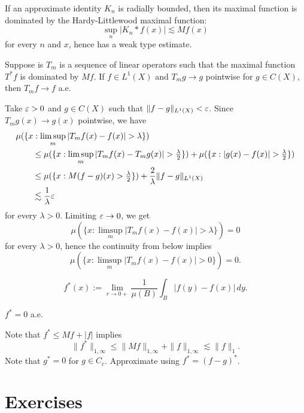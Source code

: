 \documentclass{../../large}
\begin{document}
\begin{prb}
If an approximate identity $K_n$ is radially bounded, then its maximal function is dominated by the Hardy-Littlewood maximal function:
\[\sup_n|K_n*f(x)|\lesssim Mf(x)\]
for every $n$ and $x$, hence has a weak type estimate.
\end{prb}


\begin{prb}
Suppose is $T_m$ is a sequence of linear operators such that the maximal function $T^*f$ is dominated by $Mf$.
If $f\in L^1(X)$ and $T_mg\to g$ pointwise for $g\in C(X)$, then $T_mf\to f$ a.e.
\end{prb}
\begin{pf}
Take $\varepsilon>0$ and $g\in C(X)$ such that $\|f-g\|_{L^1(X)}<\varepsilon$.
Since $T_mg(x)\to g(x)$ pointwise, we have
\begin{align*}
&\mu(\{x:\limsup_m|T_mf(x)-f(x)|>\lambda\})\\
&\qquad\le\mu(\{x:\limsup_m|T_mf(x)-T_mg(x)|>\tfrac\lambda2\})
+\mu(\{x:|g(x)-f(x)|>\tfrac\lambda2\})\\
&\qquad\le\mu(\{x:M(f-g)(x)>\tfrac\lambda2\})+\frac2\lambda\|f-g\|_{L^1(X)}\\
&\qquad\lesssim\frac1\lambda\e
\end{align*}
for every $\lambda>0$.
Limiting $\varepsilon\to0$, we get
\[\mu(\{x:\limsup_m|T_mf(x)-f(x)|>\lambda\})=0\]
for every $\lambda>0$, hence the continuity from below implies
\[\mu(\{x:\limsup_m|T_mf(x)-f(x)|>0\})=0.\]
\end{pf}


\begin{defn}
\[f^*(x):=\lim_{r\to0+}\frac1{\mu(B)}\int_B|f(y)-f(x)|\,dy.\]
\end{defn}
\begin{thm}
$f^*=0$ a.e.
\end{thm}
\begin{pf}
Note that $f^*\le Mf+|f|$ implies
\[\|f^*\|_{1,\infty}\le\|Mf\|_{1,\infty}+\|f\|_{1,\infty}\lesssim\|f\|_1.\]
Note that $g^*=0$ for $g\in C_c$.
Approximate using $f^*=(f-g)^*$.
\end{pf}

\section*{Exercises}
\begin{prb}

\end{prb}
\end{document}
